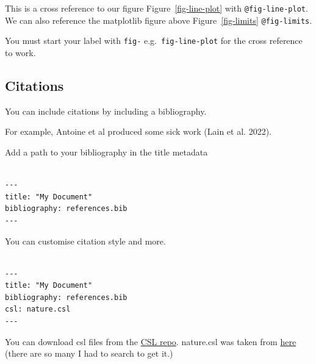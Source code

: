 \documentclass[
  letterpaper,
  DIV=11,
  numbers=noendperiod,
  oneside]{scrartcl}
\begin{document}
This is a cross reference to our figure Figure~\ref{fig-line-plot} with
\texttt{@fig-line-plot}. We can also reference the matplotlib figure
above Figure~\ref{fig-limits} \texttt{@fig-limits}.

\begin{tcolorbox}[enhanced jigsaw, colframe=quarto-callout-note-color-frame, left=2mm, bottomtitle=1mm, bottomrule=.15mm, coltitle=black, colbacktitle=quarto-callout-note-color!10!white, leftrule=.75mm, toprule=.15mm, colback=white, rightrule=.15mm, toptitle=1mm, opacityback=0, titlerule=0mm, title=\textcolor{quarto-callout-note-color}{\faInfo}\hspace{0.5em}{Note}, breakable, opacitybacktitle=0.6, arc=.35mm]

You must start your label with \texttt{fig-} e.g.~\texttt{fig-line-plot}
for the cross reference to work.

\end{tcolorbox}

\hypertarget{citations}{%
\subsection{Citations}\label{citations}}

You can include citations by including a bibliography.

For example, Antoine et al produced some sick work (Lain et al. 2022).

Add a path to your bibliography in the title metadata

\begin{verbatim}

---
title: "My Document"
bibliography: references.bib
---
\end{verbatim}

You can customise citation style and more.

\begin{verbatim}

---
title: "My Document"
bibliography: references.bib
csl: nature.csl
---
\end{verbatim}

\begin{tcolorbox}[enhanced jigsaw, colframe=quarto-callout-note-color-frame, left=2mm, bottomtitle=1mm, bottomrule=.15mm, coltitle=black, colbacktitle=quarto-callout-note-color!10!white, leftrule=.75mm, toprule=.15mm, colback=white, rightrule=.15mm, toptitle=1mm, opacityback=0, titlerule=0mm, title=\textcolor{quarto-callout-note-color}{\faInfo}\hspace{0.5em}{Note}, breakable, opacitybacktitle=0.6, arc=.35mm]

You can download csl files from the
\href{https://github.com/citation-style-language/styles}{CSL repo}.
nature.csl was taken from
\href{https://github.com/citation-style-language/styles/blob/master/nature.csl}{here}
(there are so many I had to search to get it.)

\end{tcolorbox}
\end{document}
